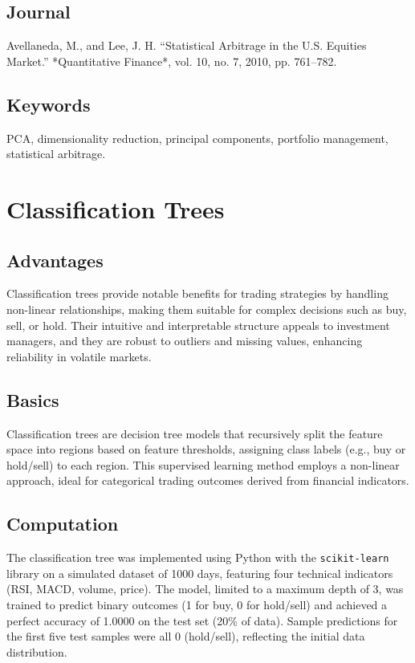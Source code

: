 \documentclass{article}
\begin{document}
\subsection{Journal}
Avellaneda, M., and Lee, J. H. “Statistical Arbitrage in the U.S. Equities Market.” *Quantitative Finance*, vol. 10, no. 7, 2010, pp. 761–782.

\subsection{Keywords}
PCA, dimensionality reduction, principal components, portfolio management, statistical arbitrage.

\section{Classification Trees}
\label{sec:classification_trees}

\subsection{Advantages}
Classification trees provide notable benefits for trading strategies by handling non-linear relationships, making them suitable for complex decisions such as buy, sell, or hold. Their intuitive and interpretable structure appeals to investment managers, and they are robust to outliers and missing values, enhancing reliability in volatile markets.

\subsection{Basics}
Classification trees are decision tree models that recursively split the feature space into regions based on feature thresholds, assigning class labels (e.g., buy or hold/sell) to each region. This supervised learning method employs a non-linear approach, ideal for categorical trading outcomes derived from financial indicators.

\subsection{Computation}
The classification tree was implemented using Python with the \texttt{scikit-learn} library on a simulated dataset of 1000 days, featuring four technical indicators (RSI, MACD, volume, price). The model, limited to a maximum depth of 3, was trained to predict binary outcomes (1 for buy, 0 for hold/sell) and achieved a perfect accuracy of 1.0000 on the test set (20\% of data). Sample predictions for the first five test samples were all 0 (hold/sell), reflecting the initial data distribution.
\end{document}
